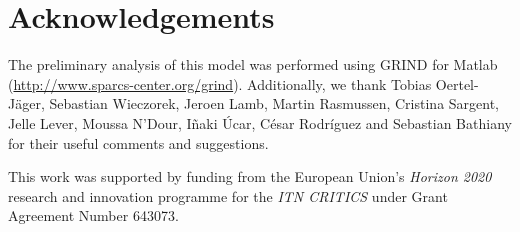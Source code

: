 \section{Acknowledgements}
\label{sec:Acknowledgements}
The preliminary analysis of this model was performed using GRIND for Matlab (\url{http://www.sparcs-center.org/grind}). Additionally, we thank Tobias Oertel-Jäger, Sebastian Wieczorek, Jeroen Lamb, Martin Rasmussen, Cristina Sargent, Jelle Lever, Moussa N'Dour, Iñaki Úcar, César Rodríguez and Sebastian Bathiany for their useful comments and suggestions. 

This work was supported by funding from the European Union's \textit{Horizon 2020} research and innovation programme for the \textit{ITN CRITICS} under Grant Agreement Number 643073.
